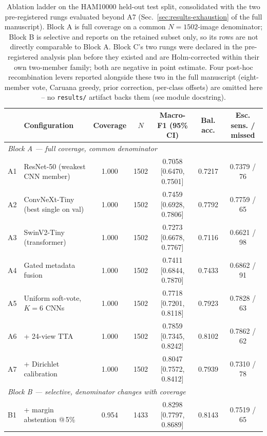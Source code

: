 \begin{table}[t]
\centering
\caption{Ablation ladder on the HAM10000 held-out test split, consolidated with the two pre-registered rungs evaluated beyond A7 (Sec.~\ref{sec:results-exhaustion} of the full manuscript). Block A is full coverage on a common $N{=}1502$-image denominator; Block B is selective and reports on the retained subset only, so its rows are not directly comparable to Block A. Block C's two rungs were declared in the pre-registered analysis plan before they existed and are Holm-corrected within their own two-member family; both are negative in point estimate. Four post-hoc recombination levers reported alongside these two in the full manuscript (eight-member vote, Caruana greedy, prior correction, per-class offsets) are omitted here -- no \texttt{results/} artifact backs them (see module docstring).}
\label{tab:ablation_edited}
\footnotesize
\setlength{\tabcolsep}{4.5pt}
\begin{tabular}{llccccc}
\toprule
& Configuration & Coverage & $N$ & Macro-F1 (95\% CI) & Bal. acc. & Esc. sens. / missed \\
\midrule
\multicolumn{7}{l}{\textit{Block A --- full coverage, common denominator}} \\
A1 & ResNet-50 (weakest CNN member) & 1.000 & 1502 & 0.7058 [0.6470, 0.7501] & 0.7217 & 0.7379 / 76 \\
A2 & ConvNeXt-Tiny (best single on val) & 1.000 & 1502 & 0.7459 [0.6928, 0.7806] & 0.7792 & 0.7759 / 65 \\
A3 & SwinV2-Tiny (transformer) & 1.000 & 1502 & 0.7273 [0.6678, 0.7767] & 0.7116 & 0.6621 / 98 \\
A4 & Gated metadata fusion & 1.000 & 1502 & 0.7411 [0.6844, 0.7870] & 0.7433 & 0.6862 / 91 \\
A5 & Uniform soft-vote, $K=6$ CNNs & 1.000 & 1502 & 0.7718 [0.7201, 0.8118] & 0.7923 & 0.7828 / 63 \\
A6 & \quad + 24-view TTA & 1.000 & 1502 & 0.7859 [0.7345, 0.8242] & 0.8102 & 0.7862 / 62 \\
A7 & \quad + Dirichlet calibration & 1.000 & 1502 & 0.8047 [0.7572, 0.8412] & 0.7939 & 0.7310 / 78 \\
\midrule
\multicolumn{7}{l}{\textit{Block B --- selective, denominator changes with coverage}} \\
B1 & \quad + margin abstention @\,5\% & 0.954 & 1433 & 0.8298 [0.7797, 0.8689] & 0.8143 & 0.7519 / 65 \\

\end{tabular}
\end{table}
